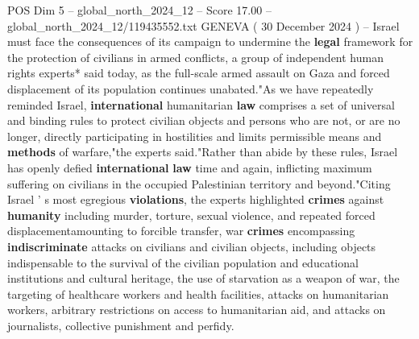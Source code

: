 \begin{textsample}{POS Dim 5 – global\_north\_2024\_12 – Score 17.00 – global\_north\_2024\_12/119435552.txt}  \label{ex:f5_pos_127}
GENEVA ( 30 December 2024 ) -- Israel must face the consequences of its campaign to undermine the \textbf{legal} framework for the protection of civilians in armed conflicts, a group of independent human rights experts* said today, as the full-scale armed assault on Gaza and forced displacement of its population continues unabated."As we have repeatedly reminded Israel, \textbf{international} humanitarian \textbf{law} comprises a set of universal and binding rules to protect civilian objects and persons who are not, or are no longer, directly participating in hostilities and limits permissible means and \textbf{methods} of warfare,"the experts said."Rather than abide by these rules, Israel has openly defied \textbf{international} \textbf{law} time and again, inflicting maximum suffering on civilians in the occupied Palestinian territory and beyond."Citing Israel ' s most egregious \textbf{violations}, the experts highlighted \textbf{crimes} against \textbf{humanity} including murder, torture, sexual violence, and repeated forced displacementamounting to forcible transfer, war \textbf{crimes} encompassing \textbf{indiscriminate} attacks on civilians and civilian objects, including objects indispensable to the survival of the civilian population and educational institutions and cultural heritage, the use of starvation as a weapon of war, the targeting of healthcare workers and health facilities, attacks on humanitarian workers, arbitrary restrictions on access to humanitarian aid, and attacks on journalists, collective punishment and perfidy.

\end{textsample}
